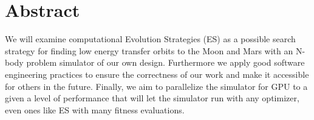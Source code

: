 \chapter{Abstract}
We will examine computational Evolution Strategies (ES) as a possible search strategy for finding low energy transfer orbits to the Moon and Mars with an N-body problem simulator of our own design. Furthermore we apply good software engineering practices to ensure the correctness of our work and make it accessible for others in the future. Finally, we aim to parallelize the simulator for GPU to a given a level of performance that will let the simulator run with any optimizer, even ones like ES with many fitness evaluations.
